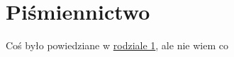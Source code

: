 \chapter{Piśmiennictwo}
\label{ch:chapter1}

Coś było powiedziane w \hyperref[ch:introduction]{rodziale 1}, ale nie wiem co
